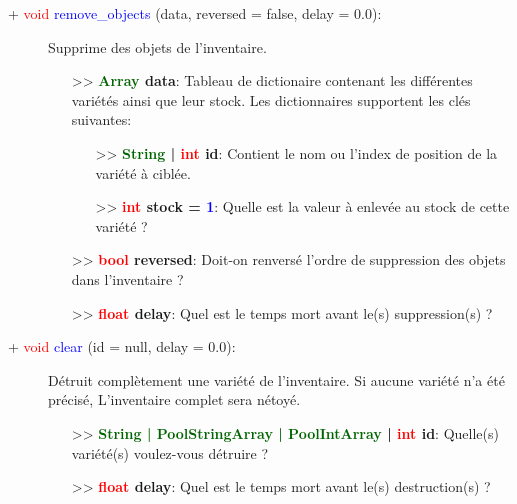 \documentclass[a4paper, 11pt]{article}
\begin{document}
	\begin{description}
		\item [+ \textcolor{red}{void} \textcolor{blue}{remove\_objects} (data, reversed = false, delay = 
		0.0):] Supprime des objets de l'inventaire.
		\begin{itemize}
			\item [>> \textbf{\textcolor{darkgreen}{Array} data}:] Tableau de dictionaire contenant les 
			différentes variétés ainsi que leur stock. Les dictionnaires supportent les clés suivantes:
			\begin{itemize}
				\item[>> \textbf{\textcolor{darkgreen}{String} | \textcolor{red}{int} id}:] Contient le 
				nom ou l'index de position de la variété à ciblée.
				\item[>> \textbf{\textcolor{red}{int} stock = \textcolor{blue}{1}}:] Quelle est la valeur à 
				enlevée au stock de cette variété ?
			\end{itemize}
			\item [>> \textbf{\textcolor{red}{bool} reversed}:] Doit-on renversé l'ordre de suppression des 
			objets dans l'inventaire ?
			\item [>> \textbf{\textcolor{red}{float} delay}:] Quel est le temps mort avant le(s) 
			suppression(s) ?\\
		\end{itemize}
	\end{description}
	\begin{description}
		\item [+ \textcolor{red}{void} \textcolor{blue}{clear} (id = null, delay = 0.0):] Détruit 
		complètement une variété de l'inventaire. Si aucune variété n'a été précisé, L'inventaire complet 
		sera nétoyé.
		\begin{itemize}
			\item[>> \textbf{\textcolor{darkgreen}{String | PoolStringArray | PoolIntArray} | 
			\textcolor{red}{int} id}:] Quelle(s) variété(s) voulez-vous détruire ?
			\item [>> \textbf{\textcolor{red}{float} delay}:] Quel est le temps mort avant le(s) 
			destruction(s) ?\\
		\end{itemize}
	\end{description}
\end{document}

